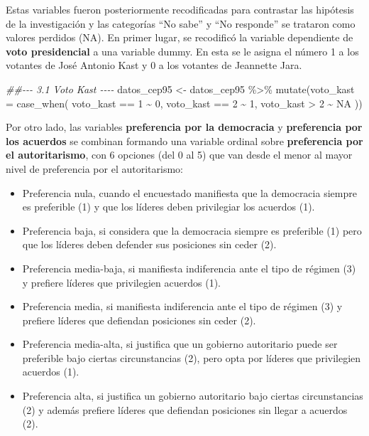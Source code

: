 \documentclass[
  spanish,
  a4paper,
  oneside]{scrbook}
\newenvironment{Shaded}{\begin{snugshade}}{\end{snugshade}}
\newcommand{\AttributeTok}[1]{\textcolor[rgb]{0.40,0.45,0.13}{#1}}
\newcommand{\ConstantTok}[1]{\textcolor[rgb]{0.56,0.35,0.01}{#1}}
\newcommand{\DecValTok}[1]{\textcolor[rgb]{0.68,0.00,0.00}{#1}}
\newcommand{\DocumentationTok}[1]{\textcolor[rgb]{0.37,0.37,0.37}{\textit{#1}}}
\newcommand{\FunctionTok}[1]{\textcolor[rgb]{0.28,0.35,0.67}{#1}}
\newcommand{\NormalTok}[1]{\textcolor[rgb]{0.00,0.23,0.31}{#1}}
\newcommand{\OtherTok}[1]{\textcolor[rgb]{0.00,0.23,0.31}{#1}}
\newcommand{\SpecialCharTok}[1]{\textcolor[rgb]{0.37,0.37,0.37}{#1}}
\begin{document}
Estas variables fueron posteriormente recodificadas para contrastar las
hipótesis de la investigación y las categorías ``No sabe'' y ``No
responde'' se trataron como valores perdidos (NA). En primer lugar, se
recodificó la variable dependiente de \textbf{voto presidencial} a una
variable dummy. En esta se le asigna el número 1 a los votantes de José
Antonio Kast y 0 a los votantes de Jeannette Jara.

\begin{Shaded}
\begin{Highlighting}[]
\DocumentationTok{\#\#{-}{-}{-} 3.1 Voto Kast {-}{-}{-}{-}}
\NormalTok{datos\_cep95 }\OtherTok{\textless{}{-}}\NormalTok{ datos\_cep95 }\SpecialCharTok{\%\textgreater{}\%}
  \FunctionTok{mutate}\NormalTok{(}\AttributeTok{voto\_kast =} \FunctionTok{case\_when}\NormalTok{(}
\NormalTok{    voto\_kast }\SpecialCharTok{==} \DecValTok{1} \SpecialCharTok{\textasciitilde{}} \DecValTok{0}\NormalTok{,}
\NormalTok{    voto\_kast }\SpecialCharTok{==} \DecValTok{2} \SpecialCharTok{\textasciitilde{}} \DecValTok{1}\NormalTok{,}
\NormalTok{    voto\_kast }\SpecialCharTok{\textgreater{}} \DecValTok{2} \SpecialCharTok{\textasciitilde{}} \ConstantTok{NA}
\NormalTok{  ))}
\end{Highlighting}
\end{Shaded}

Por otro lado, las variables \textbf{preferencia por la democracia} y
\textbf{preferencia por los acuerdos} se combinan formando una variable
ordinal sobre \textbf{preferencia por el autoritarismo}, con 6 opciones
(del 0 al 5) que van desde el menor al mayor nivel de preferencia por el
autoritarismo:

\begin{itemize}
\item
  Preferencia nula, cuando el encuestado manifiesta que la democracia
  siempre es preferible (1) y que los líderes deben privilegiar los
  acuerdos (1).
\item
  Preferencia baja, si considera que la democracia siempre es preferible
  (1) pero que los líderes deben defender sus posiciones sin ceder (2).
\item
  Preferencia media-baja, si manifiesta indiferencia ante el tipo de
  régimen (3) y prefiere líderes que privilegien acuerdos (1).
\item
  Preferencia media, si manifiesta indiferencia ante el tipo de régimen
  (3) y prefiere líderes que defiendan posiciones sin ceder (2).
\item
  Preferencia media-alta, si justifica que un gobierno autoritario puede
  ser preferible bajo ciertas circunstancias (2), pero opta por líderes
  que privilegien acuerdos (1).
\item
  Preferencia alta, si justifica un gobierno autoritario bajo ciertas
  circunstancias (2) y además prefiere líderes que defiendan posiciones
  sin llegar a acuerdos (2).
\end{itemize}
\end{document}
